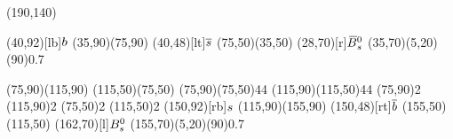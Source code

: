 \documentclass{standalone}
\begin{document}
\begin{axopicture}(190,140)

  \Text(40,92)[lb]{${b}$}       %
  \Line[arrow](35,90)(75,90)        %
  \Text(40,48)[lt]{${\overline {{s}}}$}    %
  \Line[arrow](75,50)(35,50)        %
  \Text(28,70)[r]{${{\kern 0.18em\overline{\kern -0.18em B}}{}^0_{s}}$}           %
  \GOval(35,70)(5,20)(90){0.7}      %
                                    
  \Line[arrow](75,90)(115,90)       %
  \Line[arrow](115,50)(75,50)       %
  \Photon(75,90)(75,50){4}{4}       %
  \Photon(115,90)(115,50){4}{4}     %
  \Vertex(75,90){2}                 %
  \Vertex(115,90){2}                %
  \Vertex(75,50){2}                 %
  \Vertex(115,50){2}                %
  \Text(150,92)[rb]{${s}$}      %
  \Line[arrow](115,90)(155,90)      %
  \Text(150,48)[rt]{${\overline {{b}}}$}   %
  \Line[arrow](155,50)(115,50)      %
  \Text(162,70)[l]{${{B}^0_{s}}$}           %
  \GOval(155,70)(5,20)(90){0.7}     %
                                    
\end{axopicture}
\end{document}

